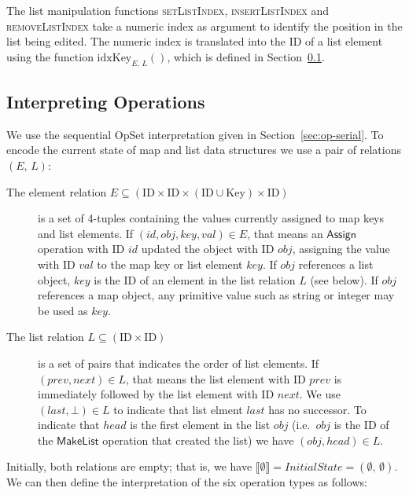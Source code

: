 The list manipulation functions \textsc{setListIndex}, \textsc{insertListIndex} and \textsc{removeListIndex} take a numeric index as argument to identify the position in the list being edited.
The numeric index is translated into the ID of a list element using the function $\mathrm{idxKey}_{E,\, L}()$, which is defined in Section~\ref{sec:datatypes-interp}.

\subsection{Interpreting Operations}\label{sec:datatypes-interp}

We use the sequential OpSet interpretation given in Section~\ref{sec:op-serial}.
To encode the current state of map and list data structures we use a pair of relations $(E,\, L)$:
\begin{description}
    \item[The element relation $E \subseteq (\mathrm{ID} \times \mathrm{ID} \times (\mathrm{ID} \cup \mathrm{Key}) \times \mathrm{ID})$]
        is a set of 4-tuples containing the values currently assigned to map keys and list elements.
        If $(\mathit{id}, \mathit{obj}, \mathit{key}, \mathit{val}) \in E$, that means an $\mathsf{Assign}$ operation with ID $\mathit{id}$ updated the object with ID $\mathit{obj}$, assigning the value with ID $\mathit{val}$ to the map key or list element $\mathit{key}$.
        If $\mathit{obj}$ references a list object, $\mathit{key}$ is the ID of an element in the list relation $L$ (see below).
        If $\mathit{obj}$ references a map object, any primitive value such as string or integer may be used as $\mathit{key}$.
    \item[The list relation $L \subseteq (\mathrm{ID} \times \mathrm{ID})$] is a set of pairs that indicates the order of list elements.
        If $(\mathit{prev}, \mathit{next}) \in L$, that means the list element with ID $\mathit{prev}$ is immediately followed by the list element with ID $\mathit{next}$.
        We use $(\mathit{last}, \bot) \in L$ to indicate that list elment $\mathit{last}$ has no successor.
        To indicate that $\mathit{head}$ is the first element in the list $\mathit{obj}$ (i.e.\ $\mathit{obj}$ is the ID of the $\mathsf{MakeList}$ operation that created the list) we have $(\mathit{obj}, \mathit{head}) \in L$.
\end{description}
Initially, both relations are empty; that is, we have $\llbracket\emptyset\rrbracket = \mathit{InitialState} = (\emptyset,\, \emptyset)$.
We can then define the interpretation of the six operation types as follows:
